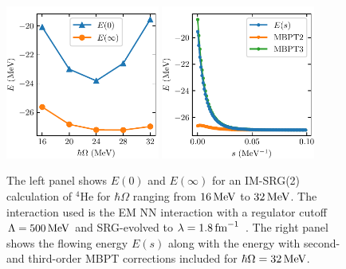 \begin{figure}[t]
  \centering
  \includegraphics[width=0.45\textwidth]{proposal/doc/images/he4_imsrg2_energies.pdf}
  \includegraphics[width=0.45\textwidth]{proposal/doc/images/he4_imsrg2_flow.pdf}
  \caption[
    The left panel shows $E(0)$ and $E(\infty)$
    for an IM-SRG(2) calculation of ${}^4\text{He}$
    for $\hbar \Omega$ ranging from $16\mev$ to $32\mev$.
    The interaction used is the EM NN interaction
    with a regulator cutoff $\Lambda=500\mev$
    and SRG-evolved to $\lambda=1.8\invfm$.
    The right panel shows the flowing energy $E(s)$
    along with the energy with second- and third-order MBPT corrections included
    for $\hbar \Omega=32\mev$.
  ]{
    The left panel shows $E(0)$ and $E(\infty)$
    for an IM-SRG(2) calculation of ${}^4\text{He}$
    for $\hbar \Omega$ ranging from $16\mev$ to $32\mev$.
    The interaction used is the EM NN interaction
    with a regulator cutoff $\Lambda=500\mev$
    and SRG-evolved to $\lambda=1.8\invfm$~\cite{Ente03n3lonn}.
    The right panel shows the flowing energy $E(s)$
    along with the energy with second- and third-order MBPT corrections included
    for $\hbar \Omega=32\mev$.
  }\label{fig:imsrg2_he4_results}
\end{figure}

